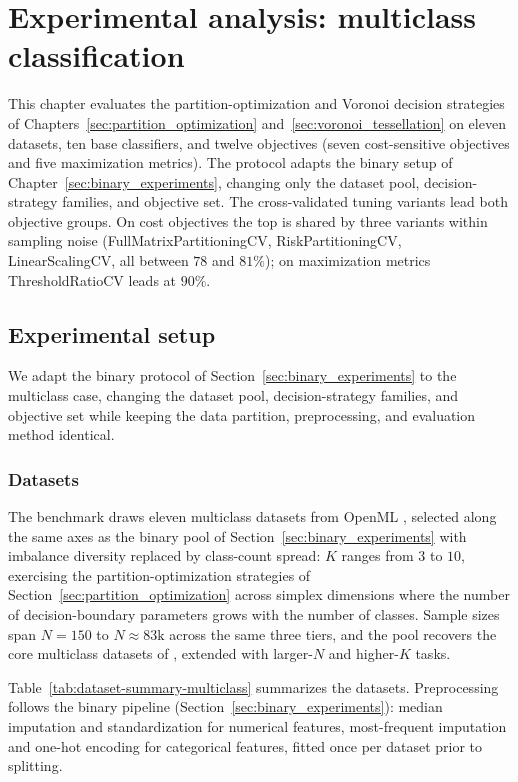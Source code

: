 \chapter{Experimental analysis: multiclass classification}\label{sec:multiclass_experiments}

This chapter evaluates the partition-optimization and Voronoi decision strategies of Chapters~\ref{sec:partition_optimization} and~\ref{sec:voronoi_tessellation} on eleven datasets, ten base classifiers, and twelve objectives (seven cost-sensitive objectives and five maximization metrics). The protocol adapts the binary setup of Chapter~\ref{sec:binary_experiments}, changing only the dataset pool, decision-strategy families, and objective set. The cross-validated tuning variants lead both objective groups. On cost objectives the top is shared by three variants within sampling noise (FullMatrixPartitioningCV, RiskPartitioningCV, LinearScalingCV, all between $78$ and $81\%$); on maximization metrics ThresholdRatioCV leads at $90\%$.

\section{Experimental setup}\label{sec:multiclass_setup}

We adapt the binary protocol of Section~\ref{sec:binary_experiments} to the multiclass case, changing the dataset pool, decision-strategy families, and objective set while keeping the data partition, preprocessing, and evaluation method identical.

\subsection{Datasets}
The benchmark draws eleven multiclass datasets from OpenML \citep{vanschoren2014openml}, selected along the same axes as the binary pool of Section~\ref{sec:binary_experiments} with imbalance diversity replaced by class-count spread: $K$ ranges from $3$ to $10$, exercising the partition-optimization strategies of Section~\ref{sec:partition_optimization} across simplex dimensions where the number of decision-boundary parameters grows with the number of classes. Sample sizes span $N=150$ to $N\approx 83\text{k}$ across the same three tiers, and the pool recovers the core multiclass datasets of \citet{obrien2008costsensitive}, extended with larger-$N$ and higher-$K$ tasks.

Table~\ref{tab:dataset-summary-multiclass} summarizes the datasets. Preprocessing follows the binary pipeline (Section~\ref{sec:binary_experiments}): median imputation and standardization for numerical features, most-frequent imputation and one-hot encoding for categorical features, fitted once per dataset prior to splitting.

